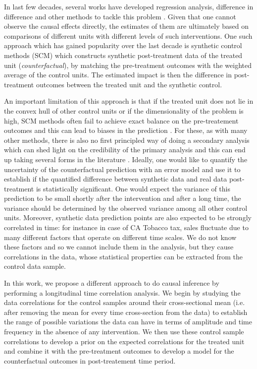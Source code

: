\documentclass{article}
\begin{document}
In last few decades, several works have developed regression analysis, difference in difference and other methods to tackle this problem \cite{Athey2016}. Given that one cannot observe the causal effects directly, the estimates of them are ultimately based on comparisons of different units with different levels of such interventions. One such approach which has gained popularity over the last decade is synthetic control methods (SCM) \cite{Abadie03, Abadie10} which constructs synthetic post-treatment data of the treated unit ({\it counterfactual}), by matching the pre-treatment outcomes with the weighted average of the control units. The estimated impact is then the difference in post-treatment outcomes between the treated unit and the synthetic control. 

An important limitation of this approach is that if the treated unit does not lie in the convex hull of other control units or if the dimensionality of the problem is high, SCM methods often fail to achieve exact balance on the pre-treatement outcomes and this can lead to biases in the prediction \cite{Ferman16, Ben-Michael18}. For these, as with many other methods, there is also no first principled way of doing a secondary analysis which can shed light on the credibility of the primary analysis and this can end up taking several forms in the literature \cite{Athey2016}. Ideally, one would like to quantify the uncertainty of the counterfactual prediction with an error model and use it to establish if the quantified difference between synthetic data and real data post-treatment is statistically significant. One would expect the variance of this prediction to be small shortly after the intervention and after a long time, the variance should be determined by the observed variance among all other control units.
Moreover, synthetic data prediction points are also expected to be strongly correlated in time: for instance in case of CA Tobacco tax, sales fluctuate due to many different factors that operate on different time scales. We do not know these factors and so we cannot include them in the analysis, but they cause correlations in the data, whose statistical properties can be extracted from the control data sample. 

In this work, we propose a different approach to do causal inference by performing a longitudinal time correlation analysis. We begin by studying the data correlations for the control samples around their cross-sectional mean (i.e. after removing the mean for every time cross-section from the data) to establish the range of possible variations the data can have in terms of amplitude and time frequency in the absence of any intervention. We then use these control sample correlations to develop a prior on the expected correlations for the treated unit and combine it with the pre-treatment outcomes to develop a model for the counterfactual outcomes in post-treatement time period.  
\end{document}
